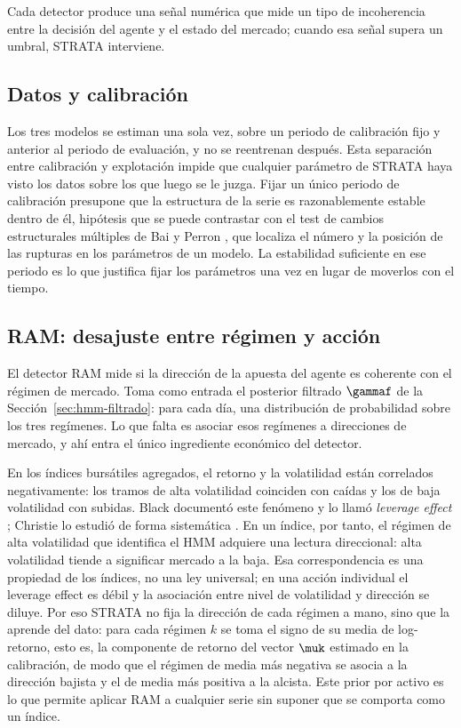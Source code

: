 Cada detector produce una señal numérica que mide un tipo de incoherencia entre la decisión del agente y el estado del mercado; cuando esa señal supera un umbral, STRATA interviene.

\subsection{Datos y calibración}
\label{sec:strata-calib}

Los tres modelos se estiman una sola vez, sobre un periodo de calibración fijo y anterior al periodo de evaluación, y no se reentrenan después. Esta separación entre calibración y explotación impide que cualquier parámetro de STRATA haya visto los datos sobre los que luego se le juzga. Fijar un único periodo de calibración presupone que la estructura de la serie es razonablemente estable dentro de él, hipótesis que se puede contrastar con el test de cambios estructurales múltiples de Bai y Perron \cite{bai1998, bai2003}, que localiza el número y la posición de las rupturas en los parámetros de un modelo. La estabilidad suficiente en ese periodo es lo que justifica fijar los parámetros una vez en lugar de moverlos con el tiempo.

\subsection{RAM: desajuste entre régimen y acción}
\label{sec:strata-ram}

El detector RAM mide si la dirección de la apuesta del agente es coherente con el régimen de mercado. Toma como entrada el posterior filtrado $\gammaf$ de la Sección~\ref{sec:hmm-filtrado}: para cada día, una distribución de probabilidad sobre los tres regímenes. Lo que falta es asociar esos regímenes a direcciones de mercado, y ahí entra el único ingrediente económico del detector.

En los índices bursátiles agregados, el retorno y la volatilidad están correlados negativamente: los tramos de alta volatilidad coinciden con caídas y los de baja volatilidad con subidas. Black documentó este fenómeno y lo llamó \emph{leverage effect} \cite{black1976}; Christie lo estudió de forma sistemática \cite{christie1982}. En un índice, por tanto, el régimen de alta volatilidad que identifica el HMM adquiere una lectura direccional: alta volatilidad tiende a significar mercado a la baja. Esa correspondencia es una propiedad de los índices, no una ley universal; en una acción individual el leverage effect es débil y la asociación entre nivel de volatilidad y dirección se diluye. Por eso STRATA no fija la dirección de cada régimen a mano, sino que la aprende del dato: para cada régimen $k$ se toma el signo de su media de log-retorno, esto es, la componente de retorno del vector $\muk$ estimado en la calibración, de modo que el régimen de media más negativa se asocia a la dirección bajista y el de media más positiva a la alcista. Este prior por activo es lo que permite aplicar RAM a cualquier serie sin suponer que se comporta como un índice.

